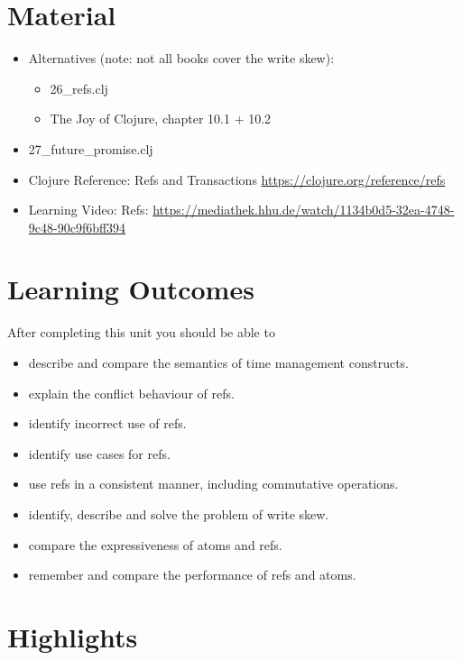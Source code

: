 \documentclass[11pt,a4paper]{article}
\begin{document}


\section{Material} 

\begin{itemize}
    \item Alternatives (note: not all books cover the write skew):
        \begin{itemize}
            \item 26\_refs.clj
            \item The Joy of Clojure, chapter 10.1 + 10.2
        \end{itemize}
            \item 27\_future\_promise.clj
    \item Clojure Reference: Refs and Transactions \url{https://clojure.org/reference/refs}
    \item Learning Video: Refs: \url{https://mediathek.hhu.de/watch/1134b0d5-32ea-4748-9c48-90c9f6bff394}
\end{itemize}


\section{Learning Outcomes}

After completing this unit you should be able to

\begin{itemize}
	\item describe and compare the semantics of time management constructs.
    \item explain the conflict behaviour of refs.
    \item identify incorrect use of refs.
    \item identify use cases for refs.
    \item use refs in a consistent manner, including commutative operations.
    \item identify, describe and solve the problem of write skew.
    \item compare the expressiveness of atoms and refs.
    \item remember and compare the performance of refs and atoms.
\end{itemize}

\section{Highlights}
\end{document}
